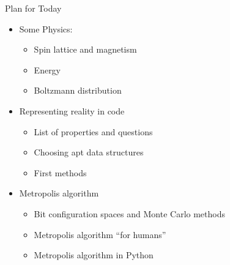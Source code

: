 
\begin{frame}[fragile]{Plan for Today}
%
\begin{itemize}
\item Some Physics: 
	\begin{itemize}
	\item Spin lattice and magnetism
	\item Energy
	\item Boltzmann distribution
	\end{itemize}
\item Representing reality in code
	\begin{itemize}
	\item List of properties and questions
	\item Choosing apt data structures
	\item First methods
	\end{itemize}
\item Metropolis algorithm
	\begin{itemize}
	\item Bit configuration spaces and Monte Carlo methods
	\item Metropolis algorithm \enquote{for humans}
	\item Metropolis algorithm in Python
	\end{itemize}
\end{itemize}
%
\end{frame}


